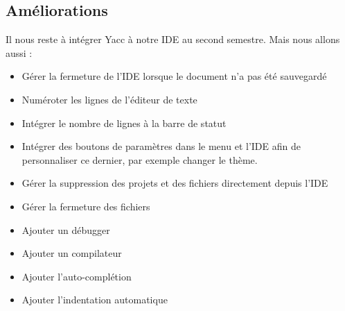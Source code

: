 \documentclass[a4paper,12pt]{article}
\begin{document}
	\subsection{Améliorations}
	Il nous reste à intégrer Yacc à notre IDE au second semestre. Mais nous allons aussi :
	\begin{itemize}
			\item Gérer la fermeture de l'IDE lorsque le document n'a pas été sauvegardé
			\item Numéroter les lignes de l'éditeur de texte
			\item Intégrer le nombre de lignes à la barre de statut
			\item Intégrer des boutons de paramètres dans le menu et l'IDE afin de personnaliser ce dernier, par exemple changer le thème.
			\item Gérer la suppression des projets et des fichiers directement depuis l'IDE
			\item Gérer la fermeture des fichiers 
			\item Ajouter un débugger
			\item Ajouter un compilateur
			\item Ajouter l'auto-complétion
			\item Ajouter l'indentation automatique
	\end{itemize}
\end{document}
